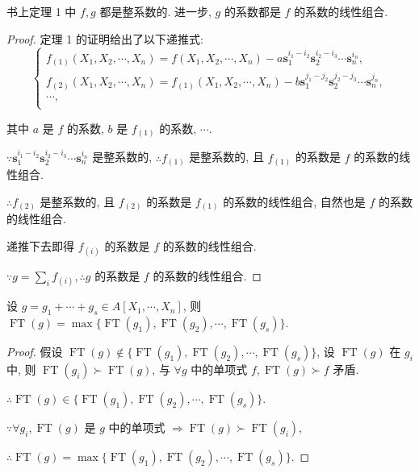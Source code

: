 \documentclass[UTF8]{ctexart}
\begin{document}
\begin{theorem}
    书上定理 1 中 $f,g$ 都是整系数的. 进一步, $g$ 的系数都是 $f$ 的系数的线性组合.
\end{theorem}
\begin{proof}
    定理 1 的证明给出了以下递推式:
    \[\begin{cases}
        f_{(1)}(X_1,X_2,\cdots,X_n)=f(X_1,X_2,\cdots,X_n)-a\mathbf{s}_1^{i_1-i_2}\mathbf{s}_2^{i_2-i_3}\cdots\mathbf{s}_n^{i_n}, \\
        f_{(2)}(X_1,X_2,\cdots,X_n)=f_{(1)}(X_1,X_2,\cdots,X_n)-b\mathbf{s}_1^{j_1-j_2}\mathbf{s}_2^{j_2-j_3}\cdots\mathbf{s}_n^{j_n}, \\
        \cdots, \\
    \end{cases}\]

    其中 $a$ 是 $f$ 的系数, $b$ 是 $f_{(1)}$ 的系数, $\cdots$.

    $\because\mathbf{s}_1^{i_1-i_2}\mathbf{s}_2^{i_2-i_3}\cdots\mathbf{s}_n^{i_n}$ 是整系数的, $\therefore f_{(1)}$ 是整系数的, 且 $f_{(1)}$ 的系数是 $f$ 的系数的线性组合.

    $\therefore f_{(2)}$ 是整系数的, 且 $f_{(2)}$ 的系数是 $f_{(1)}$ 的系数的线性组合, 自然也是 $f$ 的系数的线性组合.

    递推下去即得 $f_{(i)}$ 的系数是 $f$ 的系数的线性组合.

    $\because g=\sum\limits_{i}f_{(i)},\therefore g$ 的系数是 $f$ 的系数的线性组合.
\end{proof}
\begin{lemma}\label{l2.1}
    设 $g=g_1+\cdots+g_s\in A[X_1,\cdots,X_n]$, 则 $\operatorname{FT}(g)=\max\{\operatorname{FT}(g_1),\operatorname{FT}(g_2),\cdots,\operatorname{FT}(g_s)\}$.
\end{lemma}
\begin{proof}
    假设 $\operatorname{FT}(g)\notin\{\operatorname{FT}(g_1),\operatorname{FT}(g_2),\cdots,\operatorname{FT}(g_s)\}$, 设 $\operatorname{FT}(g)$ 在 $g_i$ 中, 则 $\operatorname{FT}(g_i)\succ\operatorname{FT}(g)$, 与 $\forall g$ 中的单项式 $f,\operatorname{FT}(g)\succ f$ 矛盾.

    $\therefore\operatorname{FT}(g)\in\{\operatorname{FT}(g_1),\operatorname{FT}(g_2),\cdots,\operatorname{FT}(g_s)\}$.

    $\because\forall g_i,\operatorname{FT}(g)$ 是 $g$ 中的单项式 $\Rightarrow\operatorname{FT}(g)\succ\operatorname{FT}(g_i)$,
    
    $\therefore\operatorname{FT}(g)=\max\{\operatorname{FT}(g_1),\operatorname{FT}(g_2),\cdots,\operatorname{FT}(g_s)\}$.
\end{proof}
\end{document}
